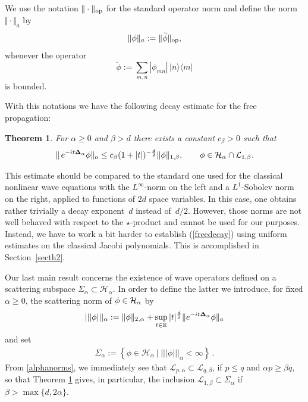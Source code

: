 \documentclass[10pt,a4paper]{amsart}
\newtheorem{theorem}{Theorem}
\begin{document}
We use the notation $\Vert\cdot\Vert_{\rm op}$ for
the standard operator norm and def\/ine the norm $\Vert\cdot\Vert_a$ by
\[
\Vert\phi\Vert_a := \Vert\widetilde\phi\Vert_{\rm op} ,
\]
whenever the operator
\[
 \widetilde\phi := \sum_{m,n}|\phi_{mn}|\, |n\rangle\langle m|
\]
 is bounded.


With this notations we have the following decay estimate for the free
propagation:

\begin{theorem}\label{th2} For $\alpha\geq 0$ and  $\beta > d$ there exists a constant
$c_\beta>0$ such that
\begin{gather}\label{freedecay}
\Vert\, e^{-it{\bf\Delta}_\alpha}\phi \Vert_a  \leq  c_{\beta}(1+
|t|)^{-\frac{d}{2}} \Vert\phi\Vert_{1,\beta} ,
\qquad \phi\in {\cal H}_\alpha\cap {\cal L}_{1,\beta} .
\end{gather}
\end{theorem}


This estimate should be compared to the standard one used for the
classical nonlinear wave equations with the $L^\infty$-norm on the
left and a $L^1$-Sobolev norm on the right, applied to
functions of $2d$ space variables. In this case, one obtains rather
trivially a decay exponent~$d$ instead of~$d/2$. However, those norms
are not well behaved with respect to the $\star$-product and cannot be
used for our purposes. Instead, we have to work a bit harder to establish
(\ref{freedecay}) using uniform estimates on the classical Jacobi
polynomials. This is accomplished in Section~\ref{secth2}.



Our last main result concerns the existence of wave operators
def\/ined on a scattering subspace $\Sigma_\alpha\subset \mathcal H_\alpha$. In order to def\/ine
the latter we introduce, for f\/ixed $\alpha\geq 0$, the scattering norm
of $\phi\in{\cal H}_\alpha$ by
\begin{gather*}%
|||\phi|||_{\alpha}:=
\Vert\phi\Vert_{2,\alpha}+\sup_{t\in\mathbb R} |t|^{\frac d2}
\Vert e^{-it{\bf\Delta}_\alpha}\phi\Vert_a
\end{gather*}
and set
\begin{gather*}
\Sigma_{\alpha}:=\left\{\phi\in\mathcal H_\alpha\,|\;|||\phi|||_{\alpha}<\infty\right\}\,.
\end{gather*}
From \eqref{alphanorms}, we immediately see that
$\mathcal L_{p,\alpha}\subset\mathcal L_{q,\beta}$, if $p\leq q$ and
$\alpha p\geq\beta q$, so that Theorem \ref{th2} gives, in particular, the
inclusion $\mathcal L_{1,\beta}\subset\Sigma_\alpha$ if $\beta> \max\{d, 2\alpha\}$.
\end{document}
